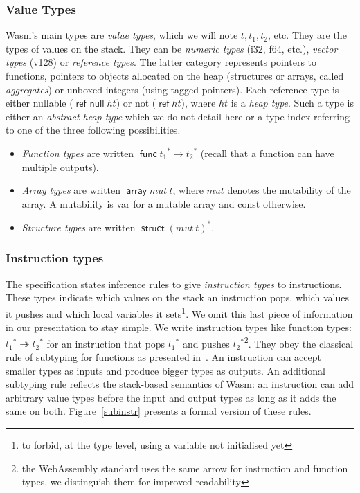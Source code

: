 \documentclass[a4paper,11pt]{article}
\DeclareMathOperator{\reft}{\textsf{ref}}
\DeclareMathOperator{\strt}{\textsf{struct}}
\DeclareMathOperator{\arrt}{\textsf{array}}
\DeclareMathOperator{\funt}{\textsf{func}}
\DeclareMathOperator{\refnullt}{\textsf{ref null}}
\begin{document}
\subsubsection{Value Types}
Wasm's main types are \emph{value types}, which we will note $t, t_1, t_2$, etc.
They are the types of values on the stack. They can be \emph{numeric types}
(\textsf{i32}, \textsf{f64}, etc.), \emph{vector types} (\textsf{v128}) or
\emph{reference types}. The latter category represents pointers to functions,
pointers to objects allocated on the heap (structures or arrays, called
\emph{aggregates}) or unboxed integers (using tagged pointers). Each reference
type is either nullable ($\refnullt ht$) or not ($\reft ht$), where $ht$ is a
\emph{heap type}. Such a type is either an \emph{abstract heap type} which we do
not detail here or a type index referring to one of the three following
possibilities.
\begin{itemize}\setlength{\itemsep}{0pt}
  \item \emph{Function types} are written
$\funt{t_1}^*\to{t_2}^*$ (recall that a function can have multiple outputs).
  \item \emph{Array types} are written $\arrt mut\ t$, where $mut$ denotes the
    mutability of the array. A mutability is \textsf{var} for a mutable array
    and \textsf{const} otherwise.
\item \emph{Structure types} are written $\strt {(mut\ t)}^*$.
\end{itemize}

\subsubsection{Instruction types}
The specification states inference rules to give \emph{instruction types} to
instructions. These types indicate which values on the stack an instruction
pops, which values it pushes and which local variables it sets\footnote{to
forbid, at the type level, using a variable not initialised yet}. We omit this
last piece of information in our presentation to stay simple. We write
instruction types like function types: ${t_1}^*\twoheadrightarrow{t_2}^*$ for an
instruction that pops ${t_1}^*$ and pushes ${t_2}^*$\footnote{the WebAssembly
standard uses the same arrow for instruction and function types, we distinguish
them for improved readability}. They obey the classical rule of subtyping for
functions as presented in~\cite{cardelli1988semantics}. An instruction can
accept smaller types as inputs and produce bigger types as outputs.
An additional subtyping rule reflects the stack-based semantics of Wasm: an
instruction can add arbitrary value types before the input and output types as
long as it adds the same on both. Figure~\ref{subinstr} presents a formal
version of these rules.
\end{document}
